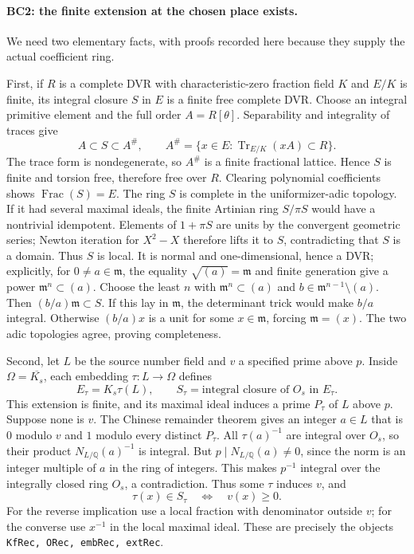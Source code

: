 \paragraph{BC2: the finite extension at the chosen place exists.}
We need two elementary facts, with proofs recorded here because they
supply the actual coefficient ring.

First, if $R$ is a complete DVR with characteristic-zero fraction field
$K$ and $E/K$ is finite, its integral closure $S$ in $E$ is a finite
free complete DVR. Choose an integral primitive element and the full
order $A=R[\theta]$. Separability and integrality of traces give
\[
 A\subset S\subset A^\#,
 \qquad A^\#=\{x\in E:\operatorname{Tr}_{E/K}(xA)\subset R\}.
                                                               \tag{BC.2}
\]
The trace form is nondegenerate, so $A^\#$ is a finite fractional
lattice. Hence $S$ is finite and torsion free, therefore free over $R$.
Clearing polynomial coefficients shows $\operatorname{Frac}(S)=E$.
The ring $S$ is complete in the uniformizer-adic topology. If it had
several maximal ideals, the finite Artinian ring $S/\pi S$ would
have a nontrivial idempotent. Elements of $1+\pi S$ are units by the
convergent geometric series; Newton iteration for $X^2-X$ therefore lifts it
to $S$, contradicting that $S$ is a domain. Thus $S$ is local.
It is normal and one-dimensional, hence a DVR; explicitly, for
$0\ne a\in\mathfrak m$, the equality $\sqrt{(a)}=\mathfrak m$
and finite generation give a power $\mathfrak m^n\subset(a)$. Choose the least $n$ with
$\mathfrak m^n\subset(a)$ and $b\in\mathfrak m^{n-1}\setminus(a)$.
Then $(b/a)\mathfrak m\subset S$. If this lay in $\mathfrak m$,
the determinant trick would make $b/a$ integral. Otherwise
$(b/a)x$ is a unit for some $x\in\mathfrak m$, forcing
$\mathfrak m=(x)$. The two adic topologies agree, proving completeness.

Second, let $L$ be the source number field and $v$ a specified prime
above $p$. Inside $\Omega=\overline{K_s}$, each embedding $\tau:L\to\Omega$
defines
\[
 E_\tau=K_s\tau(L),\qquad
 S_\tau=\text{integral closure of }O_s\text{ in }E_\tau.  \tag{BC.3}
\]
This extension is finite, and its maximal ideal induces a prime
$P_\tau$ of $L$ above $p$. Suppose none is $v$. The Chinese remainder
theorem gives an integer $a\in L$ that is $0$ modulo $v$ and $1$
modulo every distinct $P_\tau$. All $\tau(a)^{-1}$ are integral over
$O_s$, so their product $N_{L/\mathbb Q}(a)^{-1}$ is integral.
But $p\mid N_{L/\mathbb Q}(a)\ne0$, since the norm is an integer
multiple of $a$ in the ring of integers. This makes $p^{-1}$ integral
over the integrally closed ring $O_s$, a contradiction.
Thus some $\tau$ induces $v$, and
\[
 \tau(x)\in S_\tau\quad\Longleftrightarrow\quad v(x)\ge0.
                                                               \tag{BC.4}
\]
For the reverse implication use a local fraction with denominator
outside $v$; for the converse use $x^{-1}$ in the local maximal ideal.
These are precisely the objects \texttt{KfRec, ORec, embRec, extRec}.

